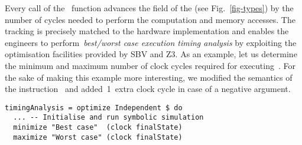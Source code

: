

Every call of the~ function advances the  field
of the  (see Fig.~\ref{fig-types}) by the number of cycles needed to
perform the computation and memory accesses. The tracking is precisely matched
to the hardware implementation and enables the engineers to
perform~\emph{best/worst case execution timing analysis} by
exploiting the optimisation facilities provided by SBV and Z3. As an example,
let us determine the minimum and maximum number of clock cycles required for
executing~. For the sake of making this example more
interesting, we modified the semantics of the instruction~ and
added~1~extra clock cycle in case of a negative argument.


\begin{verbatim}
timingAnalysis = optimize Independent $ do
  ... -- Initialise and run symbolic simulation
  minimize "Best case"  (clock finalState)
  maximize "Worst case" (clock finalState)
\end{verbatim}

